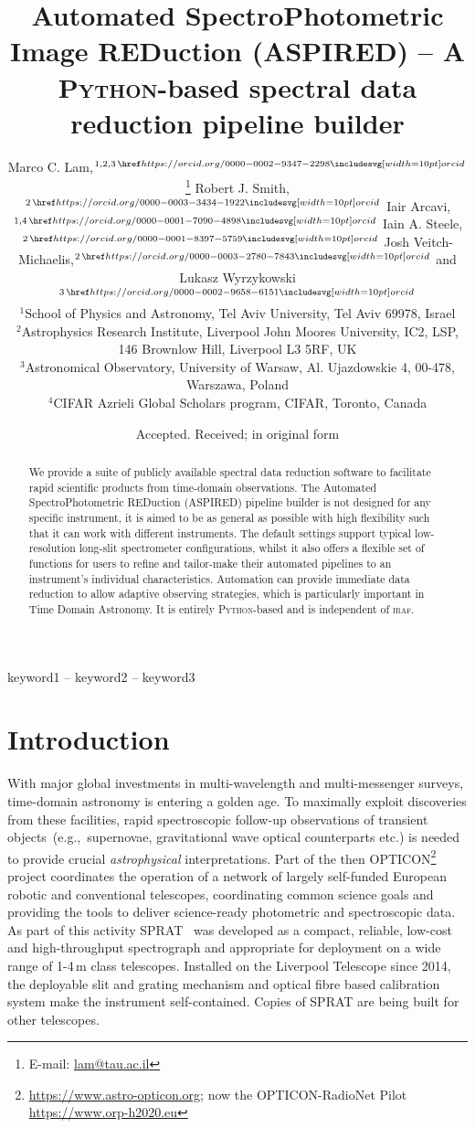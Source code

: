 \documentclass[fleqn,usenatbib]{mnras}
\title[ASPIRED]{Automated SpectroPhotometric Image REDuction (ASPIRED) -- A \textsc{Python}-based spectral data reduction pipeline builder\\
}
\author[M. C. Lam et al.]
{Marco C. Lam,$^{1, 2, 3\,\orcid{0000-0002-9347-2298}}$\thanks{E-mail: \href{mailto:lam@tau.ac.il}{lam@tau.ac.il}}
Robert J. Smith,$^{2\,\orcid{0000-0003-3434-1922}}$
Iair Arcavi,$^{1, 4\,\orcid{0000-0001-7090-4898}}$
Iain A. Steele,$^{2\,\orcid{0000-0001-8397-5759}}$
\newauthor Josh Veitch-Michaelis,$^{2\,\orcid{0000-0003-2780-7843}}$ and
Lukasz Wyrzykowski$^{3\,\orcid{0000-0002-9658-6151}}$\\
$^{1}$School of Physics and Astronomy, Tel Aviv University, Tel Aviv 69978, Israel\\
$^{2}$Astrophysics Research Institute, Liverpool John Moores University, IC2, LSP, 146 Brownlow Hill, Liverpool L3 5RF, UK\\
$^{3}$Astronomical Observatory, University of Warsaw, Al. Ujazdowskie 4, 00-478, Warszawa, Poland\\
$^{4}$CIFAR Azrieli Global Scholars program, CIFAR, Toronto, Canada
}
\date{Accepted. Received; in original form}
\begin{document}
\label{firstpage}
\pagerange{\pageref{firstpage}--\pageref{lastpage}}
\maketitle

\begin{abstract}
We provide a suite of publicly available spectral data reduction software to facilitate
rapid scientific products from time-domain observations. The Automated
SpectroPhotometric REDuction (\textsc{ASPIRED}) pipeline builder is not designed for
any specific instrument, it is aimed to be as general as possible with high flexibility
such that it can work with different instruments. The default settings support typical
low-resolution long-slit spectrometer configurations, whilst it also offers a flexible set of
functions for users to refine and tailor-make their automated pipelines to an instrument's
individual characteristics. Automation can provide immediate data reduction to allow adaptive
observing strategies, which is particularly important in Time Domain Astronomy. It is entirely
\textsc{Python}-based and is independent of \textsc{iraf}.
\end{abstract}

\begin{keywords}
keyword1 -- keyword2 -- keyword3
\end{keywords}



\section{Introduction}
With major global investments in multi-wavelength and multi-messenger surveys, time-domain
astronomy is entering a golden age. To maximally exploit discoveries from these
facilities, rapid spectroscopic follow-up observations of transient objects~(e.g.,\ supernovae,
gravitational wave optical counterparts etc.) is needed to provide crucial {\em astrophysical} 
interpretations. Part of the then OPTICON\footnote{\url{https://www.astro-opticon.org}; now the
OPTICON-RadioNet Pilot \url{https://www.orp-h2020.eu}} project
coordinates the operation of a network of largely self-funded European robotic and conventional
telescopes, coordinating common science goals and providing the tools to deliver science-ready
photometric and spectroscopic data. As part of this activity SPRAT~\citep{2014SPIE.9147E..8HP}
was developed as a compact, reliable, low-cost and high-throughput spectrograph and appropriate
for deployment on a wide range of 1-4\,m class telescopes. Installed on the Liverpool Telescope
since 2014, the deployable slit and grating mechanism and optical fibre based calibration
system make the instrument self-contained. Copies of SPRAT are being built for other 
telescopes. %
\end{document}
